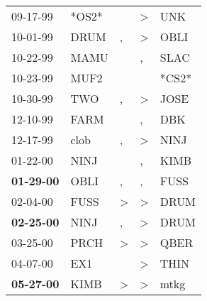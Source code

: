 \begin{supertabular}{p{0.07\textwidth}p{0.06\textwidth}p{0.02\textwidth}p{0.02\textwidth}p{0.06\textwidth}}
          09-17-99\textsuperscript{} &                            *OS2* &                  &     \textgreater &            UNK\textsuperscript{} \\
          10-01-99\textsuperscript{} &           DRUM\textsuperscript{} &                , &     \textgreater &           OBLI\textsuperscript{} \\
          10-22-99\textsuperscript{} &           MAMU\textsuperscript{} &                  &                , &           SLAC\textsuperscript{} \\
          10-23-99\textsuperscript{} &           MUF2\textsuperscript{} &                  &                  &                            *CS2* \\
          10-30-99\textsuperscript{} &            TWO\textsuperscript{} &                , &     \textgreater &           JOSE\textsuperscript{} \\
          12-10-99\textsuperscript{} &           FARM\textsuperscript{} &                  &                , &            DBK\textsuperscript{} \\
          12-17-99\textsuperscript{} &           clob\textsuperscript{} &                , &     \textgreater &           NINJ\textsuperscript{} \\
          01-22-00\textsuperscript{} &           NINJ\textsuperscript{} &                  &                , &           KIMB\textsuperscript{} \\
 \textbf{01-29-00\textsuperscript{}} &           OBLI\textsuperscript{} &                , &                , &           FUSS\textsuperscript{} \\
          02-04-00\textsuperscript{} &           FUSS\textsuperscript{} &     \textgreater &     \textgreater &           DRUM\textsuperscript{} \\
 \textbf{02-25-00\textsuperscript{}} &           NINJ\textsuperscript{} &                , &     \textgreater &           DRUM\textsuperscript{} \\
          03-25-00\textsuperscript{} &           PRCH\textsuperscript{} &     \textgreater &     \textgreater &           QBER\textsuperscript{} \\
          04-07-00\textsuperscript{} &            EX1\textsuperscript{} &                  &     \textgreater &           THIN\textsuperscript{} \\
 \textbf{05-27-00\textsuperscript{}} &           KIMB\textsuperscript{} &     \textgreater &     \textgreater &           mtkg\textsuperscript{} \\

\end{supertabular}
